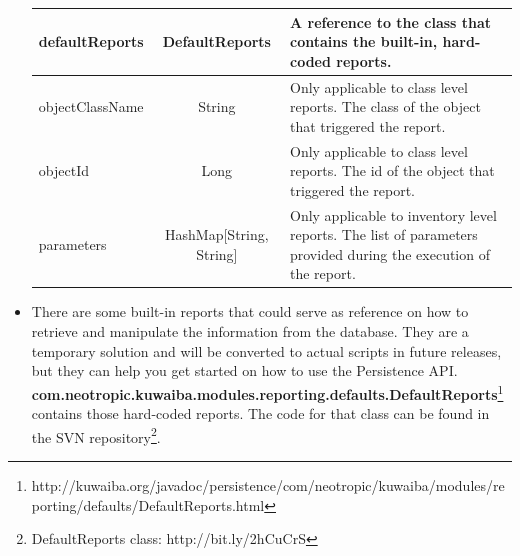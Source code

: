 \documentclass[a4paper]{article}
\begin{document}
\begin{itemize}
\begin{table}[h!]
\begin{tabular}{lcp{7cm}}
					\midrule
					defaultReports & DefaultReports & A reference to the class that contains the built-in, hard-coded reports. \\
					\midrule
					objectClassName & String & Only applicable to class level reports. The class of the object that triggered the report. \\
					\midrule
					objectId & Long & Only applicable to class level reports. The id of the object that triggered the report. \\
					\midrule
					parameters & HashMap[String, String] & Only applicable to inventory level reports. The list of parameters provided during the execution of the report.\\
				\end{tabular}
			\end{table}
			\item There are some built-in reports that could serve as reference on how to retrieve and manipulate the information from the database. They are a temporary solution and will be converted to actual scripts in future releases, but they can help you get started on how to use the Persistence API.\\
			\newline
			\textbf{com.neotropic.kuwaiba.modules.reporting.defaults.DefaultReports}\footnote{http://kuwaiba.org/javadoc/persistence/com/neotropic/kuwaiba/modules/reporting/defaults/DefaultReports.html} contains those hard-coded reports. The code for that class can be found in the SVN repository\footnote{DefaultReports class: http://bit.ly/2hCuCrS}.
		\end{itemize}
		
		\clearpage
\end{document}
